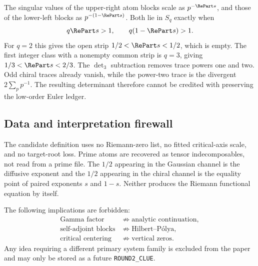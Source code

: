 The singular values of the upper-right atom blocks scale as $p^{-\RePart s}$,
and those of the lower-left blocks as $p^{-(1-\RePart s)}$. Both lie in
$S_q$ exactly when
\[
 q\RePart s>1,
 \qquad q(1-\RePart s)>1.
\]
For $q=2$ this gives the open strip $1/2<\RePart s<1/2$, which is empty.
The first integer class with a nonempty common strip is $q=3$, giving
$1/3<\RePart s<2/3$. The $\det_3$ subtraction removes trace powers one and
two. Odd chiral traces already vanish, while the power-two trace is the
divergent $2\sum_pp^{-1}$. The resulting determinant therefore cannot be
credited with preserving the low-order Euler ledger.

\subsection{Data and interpretation firewall}

The candidate definition uses no Riemann-zero list, no fitted critical-axis
scale, and no target-root loss. Prime atoms are recovered as tensor
indecomposables, not read from a prime file. The $1/2$ appearing in the
Gaussian channel is the diffusive exponent and the $1/2$ appearing in the
chiral channel is the equality point of paired exponents $s$ and $1-s$.
Neither produces the Riemann functional equation by itself.

The following implications are forbidden:
\begin{align*}
 \text{Gamma factor}&\not\Rightarrow\text{analytic continuation},\\
 \text{self-adjoint blocks}&\not\Rightarrow\text{Hilbert--P\'olya},\\
 \text{critical centering}&\not\Rightarrow\text{vertical zeros}.
\end{align*}
Any idea requiring a different primary system family is excluded from the
paper and may only be stored as a future \texttt{ROUND2\_CLUE}.
